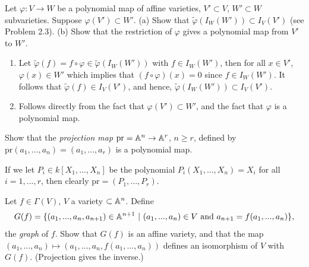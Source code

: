 \begin{exercise}
    Let $\varphi: V \to W$ be a polynomial map of affine varieties, $V' \subset V$, $W' \subset W$ subvarieties. Suppose $\varphi(V') \subset W'$. (a) Show that $\tilde{\varphi}(I_W(W')) \subset I_V(V')$ (see Problem 2.3). (b) Show that the restriction of $\varphi$ gives a polynomial map from $V'$ to $W'$. \\
\end{exercise}

\begin{solution}
    \begin{enumerate}[label=(\alph*)]
        \item Let $\tilde{\varphi}(f) = f \circ \varphi \in \tilde{\varphi}(I_W(W'))$ with $f \in I_W(W')$, then for all $x \in V'$, $\varphi(x) \in W'$ which implies that $(f\circ \varphi)(x) = 0$ since $f \in I_W(W')$. It follows that $\tilde{\varphi}(f) \in I_V(V')$, and hence, $\tilde{\varphi}(I_W(W')) \subset I_V(V')$.
        \item Follows directly from the fact that $\varphi(V') \subset W'$, and the fact that $\varphi$ is a polynomial map. \\
    \end{enumerate}
\end{solution}

\begin{exercise}
    Show that the \textit{projection map} $\text{pr} = \mathbb{A}^n \to \mathbb{A}^r$, $n \geq r$, defined by $\text{pr}(a_1, ..., a_n) = (a_1, ..., a_r)$ is a polynomial map. \\ 
\end{exercise}

\begin{solution}
    If we let $P_i \in k[X_1, ..., X_n]$ be the polynomial $P_i(X_1, ..., X_n) = X_i$ for all $i = 1, ..., r$, then clearly $\text{pr} = (P_1, ..., P_r)$. \\
\end{solution}

\begin{exercise}
    Let $f \in \Gamma(V)$, $V$ a variety $\subset \mathbb{A}^n$. Define
    $$G(f) = \{(a_1, ..., a_n, a_{n+1}) \in \A^{n+1} \ | \ (a_1, ..., a_n) \in V \text{ and } a_{n+1} = f(a_1, ..., a_n)\},$$
    the \textit{graph} of $f$. Show that $G(f)$ is an affine variety, and that the map $(a_1, ..., a_n) \mapsto (a_1, ..., a_n, f(a_1, ..., a_n))$ defines an isomorphism of $V$ with $G(f)$. (Projection gives the inverse.) \\
\end{exercise}

